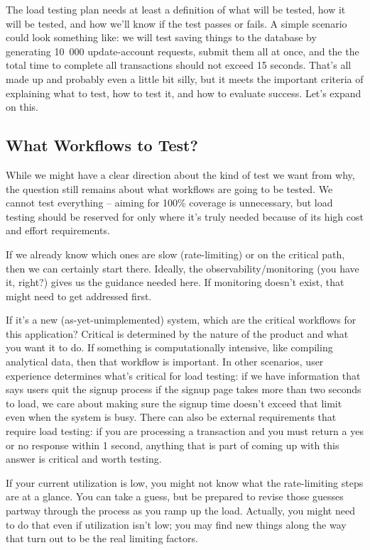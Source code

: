 The load testing plan needs at least a definition of what will be tested, how it will be tested, and how we'll know if the test passes or fails. A simple scenario could look something like: we will test saving things to the database by generating 10~000 update-account requests, submit them all at once, and the the total time to complete all transactions should not exceed 15 seconds. That's all made up and probably even a little bit silly, but it meets the important criteria of explaining what to test, how to test it, and how to evaluate success. Let's expand on this.


\subsection*{What Workflows to Test?}
While we might have a clear direction about the kind of test we want from why, the question still remains about what workflows are going to be tested. We cannot test everything -- aiming for 100\% coverage is unnecessary, but load testing should be reserved for only where it's truly needed because of its high cost and effort requirements.

If we already know which ones are slow (rate-limiting) or on the critical path, then we can certainly start there. Ideally, the observability/monitoring  (you have it, right?) gives us the guidance needed here. If monitoring doesn't exist, that might need to get addressed first. 

If it's a new (as-yet-unimplemented) system, which are the critical workflows for this application? Critical is determined by the nature of the product and what you want it to do. If something is computationally intensive, like compiling analytical data, then that workflow is important. In other scenarios, user experience determines what's critical for load testing: if we have information that says users quit the signup process if the signup page takes more than two seconds to load, we care about making sure the signup time doesn't exceed that limit even when the system is busy. There can also be external requirements that require load testing: if you are processing a transaction and you must return a yes or no response within 1 second, anything that is part of coming up with this answer is critical and worth testing.

If your current utilization is low, you might not know what the rate-limiting steps are at a glance. You can take a guess, but be prepared to revise those guesses partway through the process as you ramp up the load. Actually, you might need to do that even if utilization isn't low; you may find new things along the way that turn out to be the real limiting factors. 

